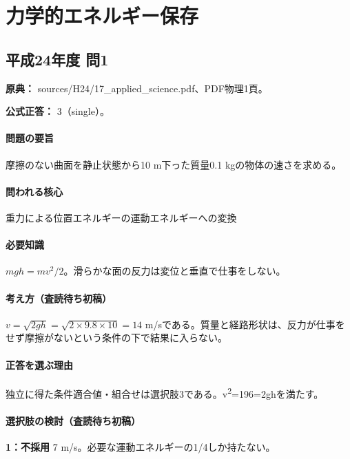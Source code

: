 \section{力学的エネルギー保存}

\subsection{平成24年度 問1}
\label{q:h24-reg-applied-01}

\noindent\textbf{原典：} sources/H24/17\_applied\_science.pdf、PDF物理1頁。

\textbf{公式正答：} 3（single）。

\paragraph{問題の要旨} 摩擦のない曲面を静止状態から10 m下った質量0.1 kgの物体の速さを求める。

\paragraph{問われる核心} 重力による位置エネルギーの運動エネルギーへの変換

\paragraph{必要知識} \(mgh=mv^2/2\)。滑らかな面の反力は変位と垂直で仕事をしない。

\paragraph{考え方（査読待ち初稿）} \(v=\sqrt{2gh}=\sqrt{2\times9.8\times10}=14\) m/sである。質量と経路形状は、反力が仕事をせず摩擦がないという条件の下で結果に入らない。

\paragraph{正答を選ぶ理由} 独立に得た条件適合値・組合せは選択肢3である。v\textsuperscript{2}=196=2ghを満たす。

\paragraph{選択肢の検討（査読待ち初稿）}

\noindent\textbf{1：不採用} 7 m/s。必要な運動エネルギーの1/4しか持たない。\par

